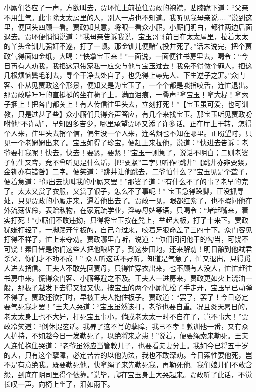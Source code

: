\documentclass[12pt,oneside]{book}
\begin{document}
小厮们答应了一声，方欲叫去，贾环忙上前拉住贾政的袍襟，贴膝跪下道：“父亲不用生气。此事除太太房里的人，别人一点也不知道。我听见我母亲说......”说到这里，便回头四顾一看。贾政知其意，将眼一看众小厮，小厮们明白，都往两边后面退去。贾环便悄悄说道：“我母亲告诉我说，宝玉哥哥前日在太太屋里，拉着太太的丫头金钏儿强奸不遂，打了一顿。那金钏儿便赌气投井死了。”话未说完，把个贾政气得面如金纸，大喝：“快拿宝玉来！”一面说，一面便往书房里去，喝令：“今日再有人劝我，我把这冠带家私一应交与他与宝玉过去！我免不得做个罪人，把这几根烦恼鬓毛剃去，寻个干净去处自了，也免得上辱先人、下生逆子之罪。”众门客、仆从见贾政这个形景，便知又是为宝玉了，一个个都是啖指咬舌，连忙退出。
那贾政喘吁吁的直挺挺的坐在椅子上，满面泪痕，一叠声“拿宝玉！拿大棍！拿索子捆上！把各门都关上！有人传信往里头去，立刻打死！”【宝玉虽可爱，也可训教，只是过甚了些】众小厮们只得齐声答应，有几个来找宝玉。那宝玉听见贾政吩咐他“不许动”，早知凶多吉少，哪里承望贾环又添了许多话。正在厅上干转，怎得个人来，往里头去捎个信，偏生没一个人来，连茗烟也不知在哪里。正盼望时，只见一个老姆姆出来了。宝玉如得了珍宝，便赶上来拉他，说道：“快进去告诉：老爷要打我呢！快去，快去！要紧，要紧！”宝玉一则急了，说话不明白；二则老婆子偏生又聋，竟不曾听见是什么话，把“要紧”二字只听作“跳井”【跳井亦非要紧，金钏亦有错咎】二字。便笑道：“跳井让他跳去，二爷怕什么？”宝玉见是个聋子，便着急道：“你出去快叫我的小厮来罢！”那婆子道：“有什么不了的事？老早的完了。太太又赏了衣服，又赏了银子，怎么不了事呢！”
宝玉急得跺脚，正没抓寻处，只见贾政的小厮走来，逼着他出去了。贾政一见，眼都红紫了，也不暇问他在外流荡优伶，表赠私物，在家荒疏学业，淫辱母婢等语，只喝令：“堵起嘴来，着实打死！”小厮们不敢违拗，只得将宝玉按在凳上，举起大板，打了十来下。贾政犹嫌打轻了，一脚踢开掌板的，自己夺过来，咬着牙狠命盖了三四十下。众门客见打得不祥了，忙上来夺劝。贾政哪里肯听，说道：“你们问问他干的勾当，可饶不可饶！素日皆是你们这些人把他酿坏了，到这步田地，还来解劝！明日酿到他弒君杀父，你们才不劝不成！”
众人听这话不好听，知道是气急了，忙又退出，只得觅人进去捎信。王夫人不敢先回贾母，只得忙穿衣出来，也不顾有人没人，忙忙赶往书房中来，慌得众门客、小厮等避之不及。王夫人一进房来，贾政更如火上浇油一般，那板子越发下去得又狠又快。按宝玉的两个小厮忙松了手走开，宝玉早已动弹不得了。贾政还欲打时，早被王夫人抱住板子。贾政道：“罢了，罢了！今日必定要气死我才罢！”王夫人哭道：“宝玉虽然该打，老爷也要自重。况且炎天暑日的，老太太身上也不大好，打死宝玉事小，倘或老太太一时不自在了，岂不事大！”贾政冷笑道：“倒休提这话。我养了这不肖的孽障，我已不孝！教训他一番，又有众人护持，不如趁今日一发勒死了，以绝将来之患！”说着，便要绳索来勒死。王夫人连忙抱住哭道：“老爷虽然应当管教儿子，也要看夫妻分上。我如今已将五十岁的人，只有这个孽障，必定苦苦的以他为法，我也不敢深劝。今日索性要他死，岂不是有意绝我。既要勒死他，快拿绳子来先勒死我，再勒死他。我们娘儿们不敢含怨，到底在阴司里得个依靠。”说毕，爬在宝玉身上大哭起来。贾政听了此话，不觉长叹一声，向椅上坐了，泪如雨下。
\end{document}
